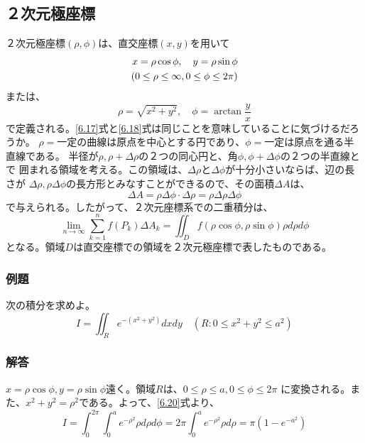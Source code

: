 \documentclass[a4j,dvipdfmx]{jsarticle}
\begin{document}
\subsection{２次元極座標}
２次元極座標$(\rho ,\phi)$は、直交座標$(x,y)$を用いて
\begin{align}
    x=\rho\cos\phi,\quad y=\rho\sin\phi\label{6.17}\\
    (0\leq\rho\leq\infty,0\leq\phi\leq2\pi)\notag
\end{align}
または、
\begin{equation}
    \rho=\sqrt{x^2+y^2},\quad\phi=\arctan\frac{y}{x}\label{6.18}
\end{equation}
で定義される。\eqref{6.17}式と\eqref{6.18}式は同じことを意味していることに気づけるだろうか。
$\rho=$一定の曲線は原点を中心とする円であり、$\phi=$一定は原点を通る半直線である。
半径が$\rho,\rho+\Delta\rho$の２つの同心円と、角$\phi,\phi+\Delta\phi$の２つの半直線とで
囲まれる領域を考える。この領域は、$\Delta \rho$と$\Delta\phi$が十分小さいならば、辺の長さが
$\Delta\rho,\rho\Delta\phi$の長方形とみなすことができるので、その面積$\Delta A$は、
\begin{equation}
    \Delta A=\rho\Delta\phi\cdot\Delta\rho=\rho\Delta\rho\Delta\phi\label{6.19}
\end{equation}
で与えられる。したがって、２次元座標系での二重積分は、
\begin{equation}
    \lim_{n\to\infty}\sum_{k=1}^{n}f(P_k)\Delta A_k=\iint_Df(\rho\cos\phi,\rho\sin\phi)\rho d\rho d\phi\label{6.20}
\end{equation}
となる。領域$D$は直交座標での領域を２次元極座標で表したものである。

\subsubsection*{例題}
次の積分を求めよ。
\begin{equation*}
    I=\iint_R e^{-(x^2+y^2)}dxdy\quad(R:0\leq x^2+y^2\leq a^2)
\end{equation*}

\subsubsection*{解答}
$x=\rho\cos\phi,y=\rho\sin\phi$遠く。領域$R$は、$0\leq\rho\leq a,0\leq\phi\leq 2\pi$
に変換される。また、$x^2+y^2=\rho^2$である。よって、\eqref{6.20}式より、
\begin{equation*}
    I=\int_0^{2\pi}\int_0^ae^{-\rho^2}\rho d\rho d\phi=2\pi\int_0^a e^{-\rho^2}\rho d\rho
    =\pi(1-e^{-a^2})
\end{equation*}
\end{document}
